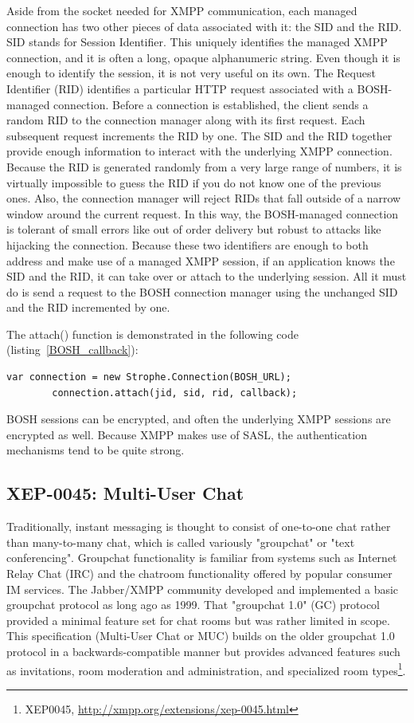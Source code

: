 Aside from the socket needed for XMPP communication, each managed connection has two other pieces of data associated with it: the SID and the RID. SID stands for Session Identifier. This uniquely identifies the managed XMPP connection, and it is often a long, opaque alphanumeric string. Even though it is enough to identify the session, it is not very useful on its own. The Request Identifier (RID) identifies a particular HTTP request associated with a BOSH-managed connection. Before a connection is established, the client sends a random RID to the connection manager along with its first request. Each subsequent request increments the RID by one. The SID and the RID together provide enough information to interact with the underlying XMPP connection. Because the RID is generated randomly from a very large range of numbers, it is virtually impossible to guess the RID if you do not know one of the previous ones. Also, the connection manager will reject RIDs that fall outside of a narrow window around the current request. In this way, the BOSH-managed connection is tolerant of small errors like out of order delivery but robust to attacks like hijacking the connection. Because these two identifiers are enough to both address and make use of a managed XMPP session, if an application knows the SID and the RID, it can take over or attach to the underlying session. All it must do is send a request to the BOSH connection manager using the unchanged SID and the RID incremented by one.

The attach() function is demonstrated in the following code (listing~\ref{BOSH_callback}):
	    \begin{lstlisting}[label=BOSH_callback,caption=BOSH Callback]
		var connection = new Strophe.Connection(BOSH_URL);
        connection.attach(jid, sid, rid, callback);
	    \end{lstlisting}

BOSH sessions can be encrypted, and often the underlying XMPP sessions are encrypted as well. Because XMPP makes use of SASL, the authentication mechanisms tend to be quite strong.


\subsection{XEP-0045: Multi-User Chat}
Traditionally, instant messaging is thought to consist of one-to-one chat rather than many-to-many chat, which is called variously "groupchat" or "text conferencing". Groupchat functionality is familiar from systems such as Internet Relay Chat (IRC) and the chatroom functionality offered by popular consumer IM services. The Jabber/XMPP community developed and implemented a basic groupchat protocol as long ago as 1999. That "groupchat 1.0" (GC) protocol provided a minimal feature set for chat rooms but was rather limited in scope. This specification (Multi-User Chat or MUC) builds on the older groupchat 1.0 protocol in a backwards-compatible manner but provides advanced features such as invitations, room moderation and administration, and specialized room types\footnote{XEP0045, \url{http://xmpp.org/extensions/xep-0045.html}}.

